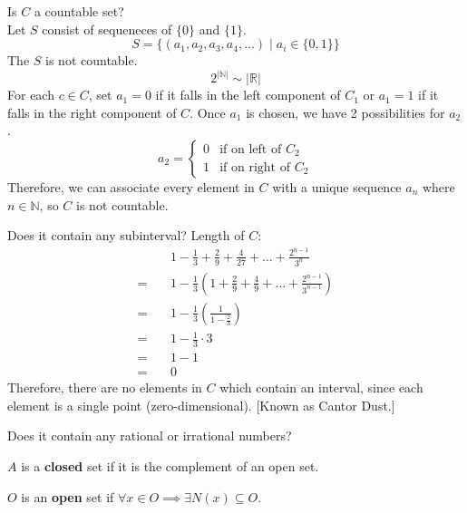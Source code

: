 \documentclass[letterpaper, 12pt]{article}
\newenvironment{definition}[1][Definition]{\begin{trivlist}
\item[\hskip \labelsep {\bfseries #1}]}{\end{trivlist}}
\newenvironment{example}[1][Example]{\begin{trivlist}
\item[\hskip \labelsep {\bfseries #1}]}{\end{trivlist}}
\newcommand{\keyword}[1]{\textbf{#1}}
\newcommand{\naturals}{\mathbb{N}}
\newcommand{\reals}{\mathbb{R}}
\begin{document}
    \begin{example}
        \begin{enumerate}
            \item Is $C$ a countable set? \\
            Let $S$ consist of sequeneces of $\{0\}$ and $\{1\}$.
            \[S = \{(a_1, a_2, a_3, a_4, \dots) \mid a_i \in \{0, 1\}\}\]
            The $S$ is not countable.
            \[2^{|\naturals|} \sim |\reals|\]
            For each $c \in C$, set $a_1 = 0$ if it falls in the left component of $C_1$ or 
            $a_1 = 1$ if it falls in the right component of $C$. Once $a_1$ is chosen, we 
            have 2 possibilities for $a_2$.
            \[a_2 = \begin{cases}
                0 & \text{if on left of $C_2$} \\
                1 & \text{if on right of $C_2$}
            \end{cases}\]
            Therefore, we can associate every element in $C$ with a unique sequence $a_n$ 
            where $n \in \naturals$, so $C$ is not countable.
            \item Does it contain any subinterval?
            Length of $C$:
            \begin{align*}
                &1 - \frac{1}{3} + \frac{2}{9} + \frac{4}{27} + \dots + \frac{2^{n-1}}{3^n} \\
                = \quad &1 - \frac{1}{3}(1 + \frac{2}{9} + \frac{4}{9} + \dots + \frac{2^{n-1}}{3^{n-1}}) \\
                = \quad &1 - \frac{1}{3}\left(\frac{1}{1 - \frac{2}{3}}\right) \\
                = \quad &1 - \frac{1}{3} \cdot 3 \\
                = \quad &1 - 1 \\
                = \quad &0
            \end{align*}
            Therefore, there are no elements in $C$ which contain an interval, since each 
            element is a single point (zero-dimensional). [Known as Cantor Dust.]
            \item Does it contain any rational or irrational numbers?
            \begin{definition}
                $A$ is a \keyword{closed} set if it is the complement of an open set.
            \end{definition}
            \begin{definition}
                $O$ is an \keyword{open} set if $\forall x \in O \implies \exists N(x) \subseteq O$.

\end{definition}
\end{enumerate}
\end{example}
\end{document}
